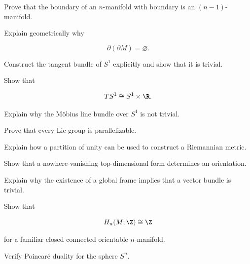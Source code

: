 \begin{exercise}[3]
Prove that the boundary of an \(n\)-manifold with boundary is an
\((n-1)\)-manifold.
\end{exercise}

\begin{exercise}[3]
Explain geometrically why

\[
\partial(\partial M)=\varnothing.
\]
\end{exercise}

\begin{exercise}[3]
Construct the tangent bundle of \(S^1\) explicitly and show that it is
trivial.
\end{exercise}

\begin{exercise}[3]
Show that

\[
TS^1\cong S^1\times\R.
\]
\end{exercise}

\begin{exercise}[3]
Explain why the M\"obius line bundle over \(S^1\) is not trivial.
\end{exercise}

\begin{exercise}[3]
Prove that every Lie group is parallelizable.
\end{exercise}

\begin{exercise}[3]
Explain how a partition of unity can be used to construct a Riemannian
metric.
\end{exercise}

\begin{exercise}[3]
Show that a nowhere-vanishing top-dimensional form determines an orientation.
\end{exercise}

\begin{exercise}[3]
Explain why the existence of a global frame implies that a vector bundle is
trivial.
\end{exercise}

\begin{exercise}[3]
Show that

\[
H_n(M;\Z)\cong\Z
\]

for a familiar closed connected orientable \(n\)-manifold.
\end{exercise}

\begin{exercise}[3]
Verify Poincar\'e duality for the sphere \(S^n\).
\end{exercise}

